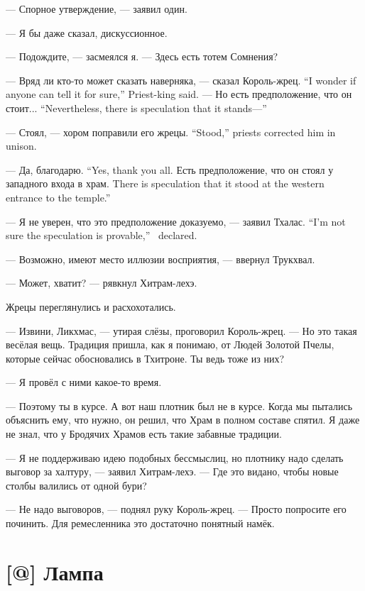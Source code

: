 --- Спорное утверждение, --- заявил один.

--- Я бы даже сказал, дискуссионное.

--- Подождите, --- засмеялся я.
--- Здесь есть тотем Сомнения?

{--- Вряд ли кто-то может сказать наверняка, --- сказал Король-жрец.}
{``I wonder if anyone can tell it for sure,'' Priest-king said.}
{--- Но есть предположение, что он стоит...}
{``Nevertheless, there is speculation that it stands---''}

{--- Стоял, --- хором поправили его жрецы.}
{``Stood,'' priests corrected him in unison.}

{--- Да, благодарю.}
{``Yes, thank you all.}
{Есть предположение, что он стоял у западного входа в храм.}
{There is speculation that it stood at the western entrance to the temple.''}

{--- Я не уверен, что это предположение доказуемо, --- заявил Тхалас.}
{``I'm not sure the speculation is provable,'' \Tchalas\ declared.}

--- Возможно, имеют место иллюзии восприятия, --- ввернул Трукхвал.

--- Может, хватит? --- рявкнул Хитрам-лехэ.

Жрецы переглянулись и расхохотались.

--- Извини, Ликхмас, --- утирая слёзы, проговорил Король-жрец.
--- Но это такая весёлая вещь.
Традиция пришла, как я понимаю, от Людей Золотой Пчелы, которые сейчас обосновались в Тхитроне.
Ты ведь тоже из них?

--- Я провёл с ними какое-то время.

--- Поэтому ты в курсе.
А вот наш плотник был не в курсе.
Когда мы пытались объяснить ему, что нужно, он решил, что Храм в полном составе спятил.
Я даже не знал, что у Бродячих Храмов есть такие забавные традиции.

--- Я не поддерживаю идею подобных бессмыслиц, но плотнику надо сделать выговор за халтуру, --- заявил Хитрам-лехэ.
--- Где это видано, чтобы новые столбы валились от одной бури?

--- Не надо выговоров, --- поднял руку Король-жрец.
--- Просто попросите его починить.
Для ремесленника это достаточно понятный намёк.

\section{[@] Лампа}

